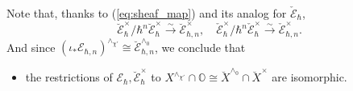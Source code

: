 \documentclass[12pt]{amsart}
\newcommand{\C}{\mathbb{C}}
\newcommand{\A}{\mathcal{A}}
\newcommand{\Orb}{\mathbb{O}}
\newcommand{\Ecal}{\mathcal{E}}
\theoremstyle{definition}
\newtheorem{Rem}[Thm]{Remark}
\numberwithin{equation}{section}
\begin{document}
Note that, thanks
to (\ref{eq:sheaf_map}) and its analog for $\check{\Ecal}_\hbar$,
$$\breve{\Ecal}^\times_{\hbar}/\hbar^n \breve{\Ecal}^\times_\hbar\xrightarrow{\sim}
\breve{\Ecal}^\times_{\hbar,n}, \quad \check{\Ecal}^\times_{\hbar}/\hbar^n \check{\Ecal}^\times_\hbar\xrightarrow{\sim}
\check{\Ecal}^\times_{\hbar,n}.$$
And since
$(\iota_*\mathcal{E}_{\hbar,n})^{\wedge_{\chi'}}\cong \breve{\Ecal}_{\hbar,n}^{\wedge_0}$,
we conclude that
\begin{itemize}
\item
the restrictions of $\Ecal_\hbar,\breve{\Ecal}^\times_\hbar$
to $X^{\wedge_{\chi'}}\cap \Orb\cong \breve{X}^{\wedge_0}\cap \breve{X}^\times$
are isomorphic.
\end{itemize}

\end{document}
